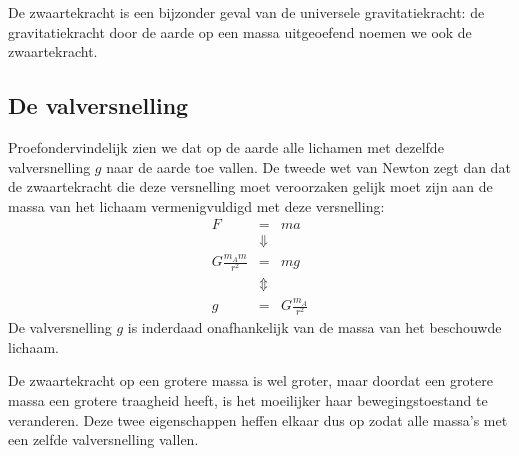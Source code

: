 \documentclass{ximera}
\begin{document}
	\author{Bart Lambregs}
    \xmsource\xmuitleg





	De zwaartekracht is een bijzonder geval van de universele gravitatiekracht: de gravitatiekracht door de aarde op een massa uitgeoefend noemen we ook de zwaartekracht.
	
	\subsection{De valversnelling}
	
	Proefondervindelijk zien we dat op de aarde alle lichamen met
	dezelfde valversnelling $g$ naar de aarde toe vallen. De tweede wet
	van Newton zegt dan dat de zwaartekracht die deze versnelling moet
	veroorzaken gelijk moet zijn aan de massa van het lichaam
	vermenigvuldigd met deze versnelling:
	\begin{eqnarray}
	F&=&ma\nonumber\\
	&\Downarrow&\nonumber\\
	G\frac{m_Am}{r^2}&=&mg\nonumber\\
	&\Updownarrow&\nonumber\\
	g&=&G\frac{m_A}{r^2}
	\end{eqnarray}
	De valversnelling $g$ is inderdaad onafhankelijk van de massa van
	het be\-schouw\-de lichaam.
	
	De zwaartekracht op een grotere massa is wel groter, maar doordat
	een grotere massa een grotere traagheid heeft, is het moeilijker haar
	bewegingstoestand te veranderen. Deze twee eigenschappen heffen
	elkaar dus op zodat alle massa's met een zelfde valversnelling vallen.
	
	
	
	
	
\end{document}
